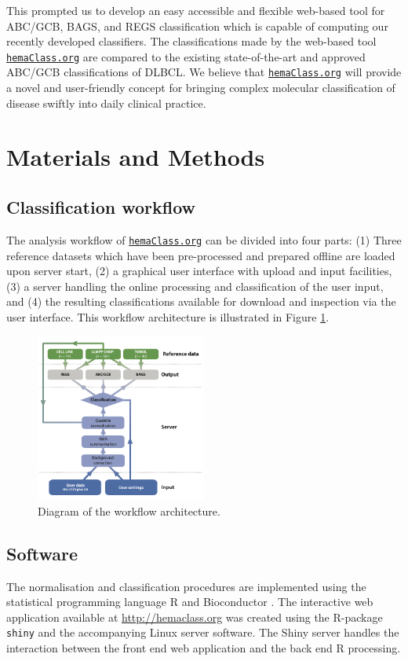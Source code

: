 \documentclass{article}
\newcommand{\hemaClass}{\href{http://hemaClass.org}{\texttt{hemaClass.org}}}
\begin{document}
This prompted us to develop an easy accessible and flexible web-based tool for ABC/GCB, BAGS, and REGS classification which is capable of computing our recently developed classifiers.
The classifications made by the web-based tool \hemaClass{} are compared to the existing state-of-the-art and approved ABC/GCB classifications of DLBCL.
We believe that \hemaClass{} will provide a novel and user-friendly concept for bringing complex molecular classification of disease swiftly into daily clinical practice.


\section{Materials and Methods}

\subsection{Classification workflow}
The analysis workflow of \hemaClass{} can be divided into four parts: (1) Three reference datasets which have been pre-processed and prepared offline are loaded upon server start, (2) a graphical user interface with upload and input facilities, (3) a server handling the online processing and classification of the user input, and (4) the resulting classifications available for download and inspection via the user interface.
This workflow architecture is illustrated in Figure \ref{fig:webtooldiagram}.

\begin{figure}
\begin{center}
\includegraphics[width=0.5\textwidth]{figures/Flowchart6.pdf}
\end{center}
\caption{Diagram of the workflow architecture.}
\label{fig:webtooldiagram}
\end{figure}

\subsection{Software}
The normalisation and classification procedures are implemented using the statistical programming language R \citep{RCoreTeam2013} and Bioconductor \citep{Gentleman2004}.
The interactive web application available at \url{http://hemaclass.org} was created using the R-package \texttt{shiny} \citep{RStudio2013} and the accompanying Linux server software.
The Shiny server handles the interaction between the front end web application and the back end R processing.
\end{document}
